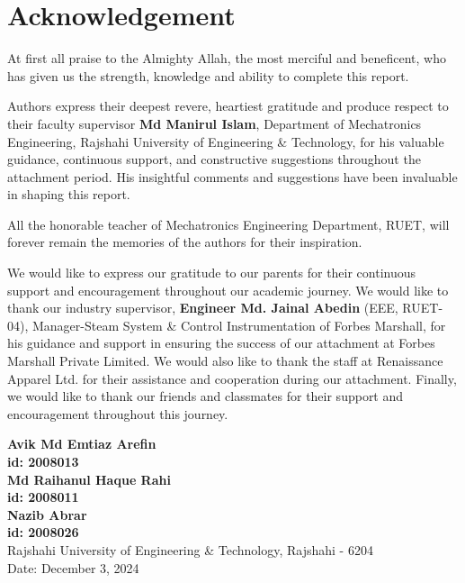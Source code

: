 \section*{Acknowledgement}
 
At first all praise to the Almighty Allah, the most merciful and beneficent, who has given us the strength, knowledge and ability to complete this report. 

Authors express their deepest revere, heartiest gratitude and produce respect to their faculty supervisor \textbf{Md Manirul Islam}, Department of Mechatronics Engineering, Rajshahi University of Engineering \& Technology, for his valuable guidance, continuous support, and constructive suggestions throughout the attachment period. His insightful comments and suggestions have been invaluable in shaping this report.

All the honorable teacher of Mechatronics Engineering Department, RUET, will forever remain the memories of the authors for their inspiration. 

We would like to express our gratitude to our parents for their continuous support and encouragement throughout our academic journey. We would like to thank our industry supervisor, \textbf{Engineer Md. Jainal Abedin} (EEE, RUET-04), Manager-Steam System \& Control Instrumentation of Forbes Marshall, for his guidance and support in ensuring the success of our attachment at Forbes Marshall Private Limited. We would also like to thank the staff at Renaissance Apparel Ltd. for their assistance and cooperation during our attachment. Finally, we would like to thank our friends and classmates for their support and encouragement throughout this journey.

\begin{flushright}
    \textbf{Avik Md Emtiaz Arefin}\\
    \textbf{id: 2008013}\\
    \textbf{Md Raihanul Haque Rahi}\\
    \textbf{id: 2008011}\\
    \textbf{Nazib Abrar}\\
    \textbf{id: 2008026}\\
    Rajshahi University of Engineering \& Technology, Rajshahi - 6204\\
    Date: December 3, 2024  
\end{flushright}

 
 
 
 
 
